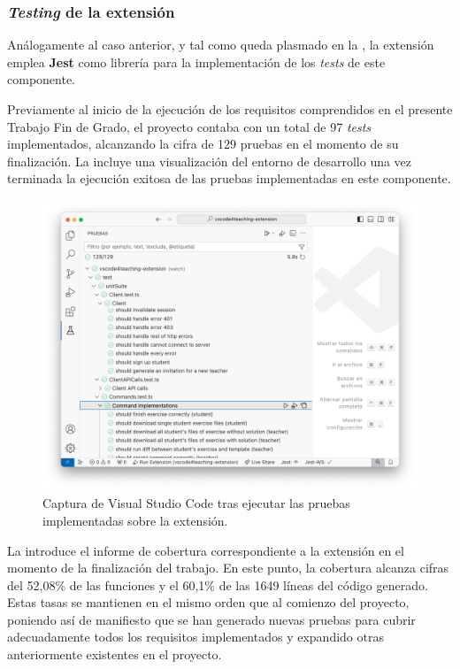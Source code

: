 \subsubsection{\textit{Testing} de la extensión}
Análogamente al caso anterior, y tal como queda plasmado en la , la extensión emplea \textbf{Jest} como librería para la implementación de los \textit{tests} de este componente.

Previamente al inicio de la ejecución de los requisitos comprendidos en el presente Trabajo Fin de Grado, el proyecto contaba con un total de 97 \textit{tests} implementados, alcanzando la cifra de 129 pruebas en el momento de su finalización. La  incluye una visualización del entorno de desarrollo una vez terminada la ejecución exitosa de las pruebas implementadas en este componente.

\begin{figure}[ht]
    \centering
    \includegraphics[width=\textwidth]{imagenes/utilizadas/4-4-verificacion/testsCliente.png}
    \caption{Captura de Visual Studio Code tras ejecutar las pruebas implementadas sobre la extensión.}
    \label{fig:testsClienteIDE}
\end{figure}

La  introduce el informe de cobertura correspondiente a la extensión en el momento de la finalización del trabajo. En este punto, la cobertura alcanza cifras del 52,08\% de las funciones y el 60,1\% de las 1649 líneas del código generado. Estas tasas se mantienen en el mismo orden que al comienzo del proyecto, poniendo así de manifiesto que se han generado nuevas pruebas para cubrir adecuadamente todos los requisitos implementados y expandido otras anteriormente existentes en el proyecto.

